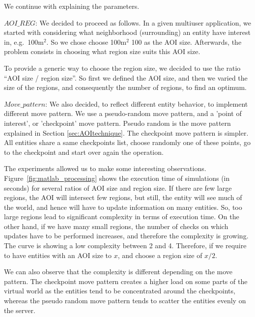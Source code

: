 \documentclass[]{elsarticle}
\begin{document}
We continue with explaining the parameters.

\vspace{1.5ex}
\noindent $AOI\_REG$: We decided to proceed as follows. In a given multiuser application, we started with considering what neighborhood (surrounding) an entity have interest in, e.g.~100m$^2$. So we chose choose 100m$^2$ 100 as the AOI size.
Afterwards, the problem consists in choosing what region size suits this AOI size.

To provide a generic way to choose the region size, we decided to use the ratio ``AOI size / region size''. So first we defined the AOI size, and then we varied the size of the regions, and consequently the number of regions, to find an optimum.

\vspace{1.5ex}
\noindent $Move\_pattern$: We also decided, to reflect different entity behavior, to implement different move pattern. We use a pseudo-random move pattern, and a 'point of interest', or 'checkpoint' move pattern.
Pseudo random is the move pattern explained in Section \ref{sec:AOItechnique}.
The checkpoint move pattern is simpler. All entities share a same checkpoints list, choose randomly one of these points, go to the checkpoint and start over again the operation.

The experiments allowed us to make some interesting observations.
Figure~\ref{fig:matlab_processing} shows the execution time of simulations (in seconds) for several ratios of AOI size and region size. If there are few large regions, the AOI will intersect few regions, but still, the entity will see much of the world, and hence will have to update information on many entities. So, too large regions lead to significant complexity in terms of execution time. On the other hand, if we have many small regions, the number of checks on which updates have to be performed increases, and therefore the complexity is growing.
The curve is showing a low complexity between 2 and 4. Therefore, if we require to have entities with an AOI size to $x$, and choose a region size of $x/2$.

We can also observe that the complexity is different depending on the move pattern. The checkpoint move pattern creates a higher load on some parts of the virtual world as the entities tend to be concentrated around the checkpoints, whereas the pseudo random move pattern tends to scatter the entities evenly on the server.
\end{document}
